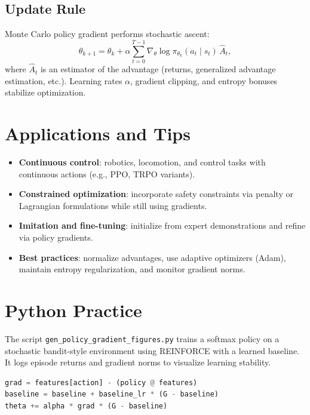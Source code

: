 ﻿\documentclass[12pt]{article}
\begin{document}
\subsection{Update Rule}
Monte Carlo policy gradient performs stochastic ascent:
\begin{equation}
\theta_{k+1} = \theta_k + \alpha \sum_{t=0}^{T-1} \nabla_\theta \log \pi_{\theta_k}(a_t\mid s_t)\, \hat{A}_t,
\end{equation}
where \(\hat{A}_t\) is an estimator of the advantage (returns, generalized advantage estimation, etc.). Learning rates \(\alpha\), gradient clipping, and entropy bonuses stabilize optimization.

\section{Applications and Tips}
\begin{itemize}
  \item \textbf{Continuous control}: robotics, locomotion, and control tasks with continuous actions (e.g., PPO, TRPO variants).
  \item \textbf{Constrained optimization}: incorporate safety constraints via penalty or Lagrangian formulations while still using gradients.
  \item \textbf{Imitation and fine-tuning}: initialize from expert demonstrations and refine via policy gradients.
  \item \textbf{Best practices}: normalize advantages, use adaptive optimizers (Adam), maintain entropy regularization, and monitor gradient norms.
\end{itemize}

\section{Python Practice}
The script \texttt{gen\_policy\_gradient\_figures.py} trains a softmax policy on a stochastic bandit-style environment using REINFORCE with a learned baseline. It logs episode returns and gradient norms to visualize learning stability.
\begin{lstlisting}[language=Python,caption={Excerpt from gen_policy_gradient_figures.py}]
grad = features[action] - (policy @ features)
baseline = baseline + baseline_lr * (G - baseline)
theta += alpha * grad * (G - baseline)
\end{lstlisting}
\end{document}
